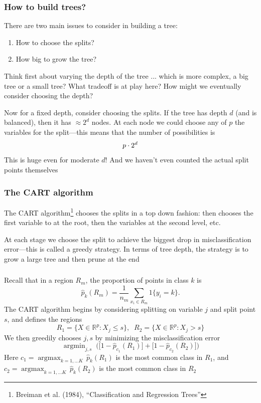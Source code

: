 \documentclass[mathserif]{beamer}
\newcommand{\argmax}{\mathop{\mathrm{argmax}}}
\newcommand{\argmin}{\mathop{\mathrm{argmin}}}
\def\R{\mathds{R}}
\def\red{\color[rgb]{0.8,0,0}}
\begin{document}
\begin{frame}
\frametitle{How to build trees?}

\smallskip
There are two main issues to consider in building a tree:
\begin{enumerate}
\item How to choose the splits?
\item How big to grow the tree?
\end{enumerate}

\bigskip
Think first about varying the depth of the tree ... which is more complex,
a big tree or a small tree? What {\red tradeoff} is at play here? 
How might we eventually consider choosing the depth?

\bigskip
Now for a fixed depth, consider choosing the splits. If the tree has 
depth $d$ (and is balanced), then it has $\approx 2^d$ nodes. At each node
we could choose any of $p$ the variables for the split---this means 
that the number of possibilities is
\vspace{-3pt}
$$p \cdot 2^d
\vspace{-3pt}$$
This is {\red huge} even for moderate $d$! And we haven't even
counted the actual split points themselves
\end{frame}

\begin{frame}
\frametitle{The CART algorithm}
\smallskip
The {\red CART algorithm}\footnote{Breiman et al. (1984), ``Classification
and Regression Trees''} 
chooses the splits in a top down fashion: then chooses the first variable 
to at the root, then the variables at the second level, etc. 

\bigskip
At each stage we choose the split to achieve the biggest
drop in misclassification error---this is called a {\red greedy} strategy.
In terms of tree depth, the strategy is to grow a large tree and then {\red prune} 
at the end

\end{frame}

\begin{frame}
\frametitle{}
Recall that in a region $R_m$, the proportion of points in class $k$ is
$$\hat{p}_k(R_m) = \frac{1}{n_m} \sum_{x_i \in R_m} 1\{y_i=k\}.$$
The CART algorithm begins by considering splitting on variable $j$ and split 
point $s$, and defines the regions
$$R_1 = \{X \in \R^p : X_j \leq s\}, \;\;
R_2 = \{X \in \R^p : X_j > s\}$$
We then {\red greedily} chooses $j,s$ by minimizing the misclassification error
$$\argmin_{j,s} \; \Big( \big[1-\hat{p}_{c_1}(R_1)\big] + 
\big[1-\hat{p}_{c_2}(R_2)\big] \Big)$$
Here $c_1 = \argmax_{k=1,\ldots K} \, \hat{p}_k(R_1)$ is the most common class
in $R_1$, and $c_2 = \argmax_{k=1,\ldots K} \, \hat{p}_k(R_2)$ is the most 
common class in $R_2$
\end{frame}
\end{document}
